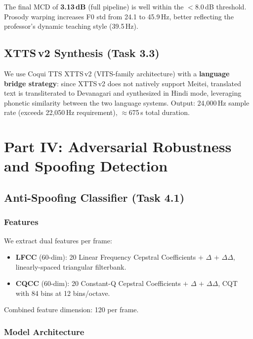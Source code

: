 \documentclass[11pt]{article}
\begin{document}
The final MCD of \textbf{3.13\,dB} (full pipeline) is well within the
$<$8.0\,dB threshold. Prosody warping increases F0 std from 24.1 to
45.9\,Hz, better reflecting the professor's dynamic teaching style (39.5\,Hz).

\subsection{XTTS\,v2 Synthesis (Task 3.3)}

We use Coqui TTS XTTS\,v2 (VITS-family architecture) with a
\textbf{language bridge strategy}: since XTTS\,v2 does not natively support
Meitei, translated text is transliterated to Devanagari and synthesized in
Hindi mode, leveraging phonetic similarity between the two language systems.
Output: 24,000\,Hz sample rate (exceeds 22,050\,Hz requirement),
$\approx$675\,s total duration.

\section{Part IV: Adversarial Robustness and Spoofing Detection}

\subsection{Anti-Spoofing Classifier (Task 4.1)}

\subsubsection{Features}

We extract dual features per frame:
\begin{itemize}
  \item \textbf{LFCC} (60-dim): 20 Linear Frequency Cepstral Coefficients
        $+$ $\Delta$ $+$ $\Delta\Delta$, linearly-spaced triangular filterbank.
  \item \textbf{CQCC} (60-dim): 20 Constant-Q Cepstral Coefficients
        $+$ $\Delta$ $+$ $\Delta\Delta$, CQT with 84 bins at 12 bins/octave.
\end{itemize}
Combined feature dimension: 120 per frame.

\subsubsection{Model Architecture}
\end{document}
